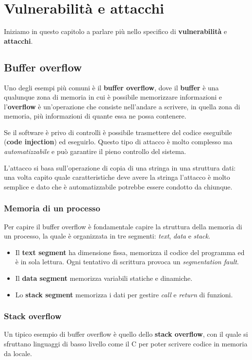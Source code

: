 \chapter{Vulnerabilità e attacchi}
Iniziamo in questo capitolo a parlare più nello specifico di \textbf{vulnerabilità} e \textbf{attacchi}.

\section{Buffer overflow}
Uno degli esempi più comuni è il \textbf{buffer overflow}, dove il \textbf{buffer} è una qualunque zona di memoria
in cui è possibile memorizzare informazioni e l'\textbf{overflow} è un'operazione che consiste nell'andare a scrivere,
in quella zona di memoria, più informazioni di quante essa ne possa contenere.

Se il software è privo di controlli è possibile trasmettere del codice eseguibile (\textbf{code injection}) ed
eseguirlo. Questo tipo di attacco è molto complesso ma \emph{automatizzabile} e può garantire il pieno controllo del
sistema.

L'attacco si basa sull'operazione di copia di una stringa in una struttura dati: una volta capito quale caratteristiche
deve avere la stringa l'attacco è molto semplice e dato che è automatizzabile potrebbe essere condotto da chiunque.

\subsection{Memoria di un processo}
Per capire il buffer overflow è fondamentale capire la struttura della memoria di un processo, la quale è organizzata
in tre segmenti: \emph{text}, \emph{data} e \emph{stack}.
\begin{itemize}
	\item Il \textbf{text segment} ha dimensione fissa, memorizza il codice del programma ed è in sola lettura. Ogni
	      tentativo di scrittura provoca un \emph{segmentation fault}.
	\item Il \textbf{data segment} memorizza variabili statiche e dinamiche.
	\item Lo \textbf{stack segment} memorizza i dati per gestire \emph{call} e \emph{return} di funzioni.
\end{itemize}

\subsection{Stack overflow}
Un tipico esempio di buffer overflow è quello dello \textbf{stack overflow}, con il quale si sfruttano linguaggi di
basso livello come il C per poter scrivere codice in memoria da locale.


